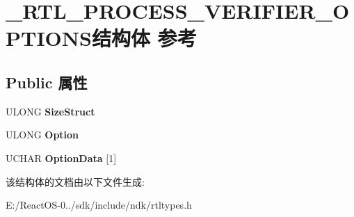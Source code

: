 \hypertarget{struct___r_t_l___p_r_o_c_e_s_s___v_e_r_i_f_i_e_r___o_p_t_i_o_n_s}{}\section{\+\_\+\+R\+T\+L\+\_\+\+P\+R\+O\+C\+E\+S\+S\+\_\+\+V\+E\+R\+I\+F\+I\+E\+R\+\_\+\+O\+P\+T\+I\+O\+N\+S结构体 参考}
\label{struct___r_t_l___p_r_o_c_e_s_s___v_e_r_i_f_i_e_r___o_p_t_i_o_n_s}
\subsection*{Public 属性}
\begin{DoxyCompactItemize}
\item 
\mbox{\label{struct___r_t_l___p_r_o_c_e_s_s___v_e_r_i_f_i_e_r___o_p_t_i_o_n_s_ad03988fda5f8ed4f5638f55f5622266d}} 
U\+L\+O\+NG {\bfseries Size\+Struct}
\item 
\mbox{\label{struct___r_t_l___p_r_o_c_e_s_s___v_e_r_i_f_i_e_r___o_p_t_i_o_n_s_ab7d0f13ee911c2edc699d397405c12f9}} 
U\+L\+O\+NG {\bfseries Option}
\item 
\mbox{\label{struct___r_t_l___p_r_o_c_e_s_s___v_e_r_i_f_i_e_r___o_p_t_i_o_n_s_a0ebed64f3b81dfe4244af609bf8fb38d}} 
U\+C\+H\+AR {\bfseries Option\+Data} \mbox{[}1\mbox{]}
\end{DoxyCompactItemize}


该结构体的文档由以下文件生成\+:\begin{DoxyCompactItemize}
\item 
E\+:/\+React\+O\+S-\/0../sdk/include/ndk/rtltypes.\+h\end{DoxyCompactItemize}

